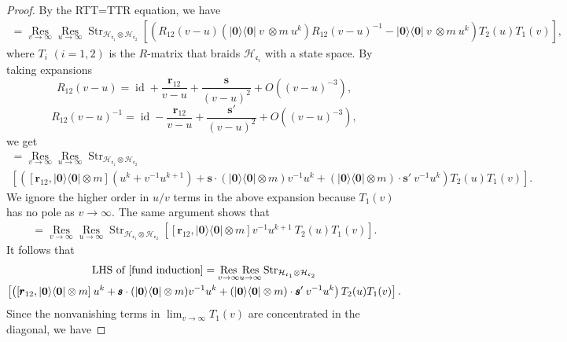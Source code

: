 \documentclass[10pt,a4paper]{amsart}
\newcommand{\Res}{\operatorname{Res}}
\newcommand{\cH}{\mathcal{H}}
\newcommand{\id}{\operatorname{id}}
\newcommand{\str}{\operatorname{Str}}
\begin{document}
\begin{proof}
By the RTT=TTR equation, we have
\begin{align*}
[\mathsf E(|\mathbf 0\rangle\langle\mathbf 0|\: v),\mathsf E(m\: u^{k})]=\underset{v\to \infty}{\Res}\underset{u\to \infty}{\Res}\str_{\cH_{\mathfrak{c}_1}\otimes \cH_{\mathfrak{c}_2}}\left[\left(R_{12}(v-u)(|\mathbf 0\rangle\langle\mathbf 0|\: v\:\otimes m\: u^{k})R_{12}(v-u)^{-1}- |\mathbf 0\rangle\langle\mathbf 0|\: v\:\otimes m\: u^{k}\right)T_2(u)T_{1}(v)\right],
\end{align*}
where $T_i$ $(i=1,2)$ is the $R$-matrix that braids $\cH_{\mathfrak{c}_i}$ with a state space. By taking expansions 
$$R_{12}(v-u)=\id+\frac{\pmb r_{12}}{v-u}+\frac{\pmb s}{(v-u)^2}+O((v-u)^{-3}),$$ 
$$R_{12}(v-u)^{-1}=\id-\frac{\pmb r_{12}}{v-u}+\frac{\pmb s'}{(v-u)^2}+O((v-u)^{-3}),$$ 
we get
\begin{multline*}
[\mathsf E(|\mathbf 0\rangle\langle\mathbf 0|\: v),\mathsf E(m\: u^{k})]=\underset{v\to \infty}{\Res}\underset{u\to \infty}{\Res}\str_{\cH_{\mathfrak{c}_1}\otimes \cH_{\mathfrak{c}_2}}\\
\left[\left([\pmb r_{12},|\mathbf 0\rangle\langle\mathbf 0| \otimes m](u^k+v^{-1}u^{k+1})+\pmb s\cdot(|\mathbf 0\rangle\langle\mathbf 0| \otimes m)v^{-1}u^k+(|\mathbf 0\rangle\langle\mathbf 0| \otimes m)\cdot \pmb s'\:v^{-1}u^k\right)T_2(u)T_{1}(v)\right].
\end{multline*}
We ignore the higher order in $u/v$ terms in the above expansion because $T_1(v)$ has no pole as $v\to \infty$. The same argument shows that
\begin{align*}
[\mathsf E(|\mathbf 0\rangle\langle\mathbf 0|\: v),\mathsf E(m\: u^{k})]=\underset{v\to \infty}{\Res}\underset{u\to \infty}{\Res}\str_{\cH_{\mathfrak{c}_1}\otimes \cH_{\mathfrak{c}_2}}
\left[[\pmb r_{12},|\mathbf 0\rangle\langle\mathbf 0| \otimes m]v^{-1}u^{k+1}\:T_2(u)T_{1}(v)\right].
\end{align*}
It follows that
\begin{multline*}
\text{LHS of \eqref{fund induction}}=\underset{v\to \infty}{\Res}\underset{u\to \infty}{\Res}\str_{\cH_{\mathfrak{c}_1}\otimes \cH_{\mathfrak{c}_2}}
\\
\left[\left([\pmb r_{12},|\mathbf 0\rangle\langle\mathbf 0| \otimes m]\:u^{k}+\pmb s\cdot(|\mathbf 0\rangle\langle\mathbf 0| \otimes m)v^{-1}u^k+(|\mathbf 0\rangle\langle\mathbf 0| \otimes m)\cdot \pmb s'\:v^{-1}u^k\right)T_2(u)T_{1}(v)\right].
\end{multline*}
Since the nonvanishing terms in $\lim_{v\to \infty}T_1(v)$ are concentrated in the diagonal, we have 

\end{proof}
\end{document}
